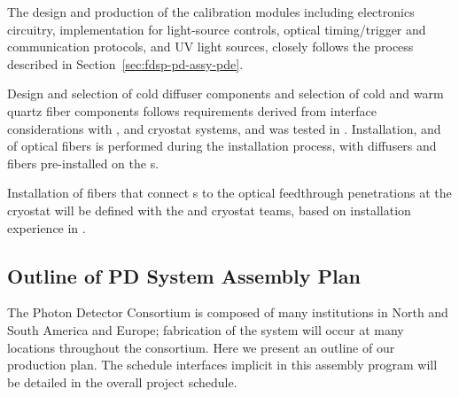 The design and production of the calibration modules including electronics circuitry,   implementation for light-source controls, optical timing/trigger and  communication protocols, and UV light sources, closely follows the process described in Section~\ref{sec:fdsp-pd-assy-pde}.

Design and selection of cold diffuser components and selection of cold and warm quartz fiber components follows requirements derived from interface considerations with ,   and cryostat systems,  
and was tested in .
Installation,  and  of optical fibers is performed during the  installation process, with diffusers and  fibers pre-installed on the s.

Installation of fibers that connect s %
to the optical feedthrough penetrations at the cryostat will be defined with the  and cryostat teams, based on installation experience in . 

\subsection{Outline of PD System Assembly Plan}
\label{sec:fdsp-pd-assy-Assby-plan}

The Photon Detector Consortium is composed of many institutions in North and South America and Europe; fabrication of the system will occur at many locations throughout the consortium.  Here we present an outline of our production plan.  The schedule interfaces implicit in this assembly program will be detailed in the overall project schedule.

